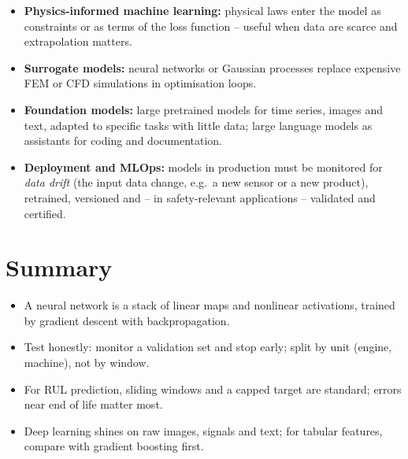 \documentclass[
  letterpaper,
  DIV=11,
  numbers=noendperiod]{scrreprt}
\providecommand{\tightlist}{%
  \setlength{\itemsep}{0pt}\setlength{\parskip}{0pt}}\usepackage{longtable,booktabs,array}
\begin{document}
\begin{itemize}
\tightlist
\item
  \textbf{Physics-informed machine learning:} physical laws enter the
  model as constraints or as terms of the loss function -- useful when
  data are scarce and extrapolation matters.
\item
  \textbf{Surrogate models:} neural networks or Gaussian processes
  replace expensive FEM or CFD simulations in optimisation loops.
\item
  \textbf{Foundation models:} large pretrained models for time series,
  images and text, adapted to specific tasks with little data; large
  language models as assistants for coding and documentation.
\item
  \textbf{Deployment and MLOps:} models in production must be monitored
  for \emph{data drift} (the input data change, e.g.~a new sensor or a
  new product), retrained, versioned and -- in safety-relevant
  applications -- validated and certified.
\end{itemize}

\section{Summary}\label{summary-12}

\begin{tcolorbox}[enhanced jigsaw, left=2mm, title=\textcolor{quarto-callout-important-color}{\faExclamation}\hspace{0.5em}{Key takeaways}, opacityback=0, breakable, rightrule=.15mm, arc=.35mm, toptitle=1mm, colbacktitle=quarto-callout-important-color!10!white, opacitybacktitle=0.6, coltitle=black, colframe=quarto-callout-important-color-frame, bottomrule=.15mm, leftrule=.75mm, bottomtitle=1mm, titlerule=0mm, toprule=.15mm, colback=white]

\begin{itemize}
\tightlist
\item
  A neural network is a stack of linear maps and nonlinear activations,
  trained by gradient descent with backpropagation.
\item
  Test honestly: monitor a validation set and stop early; split by unit
  (engine, machine), not by window.
\item
  For RUL prediction, sliding windows and a capped target are standard;
  errors near end of life matter most.
\item
  Deep learning shines on raw images, signals and text; for tabular
  features, compare with gradient boosting first.
\end{itemize}

\end{tcolorbox}
\end{document}
